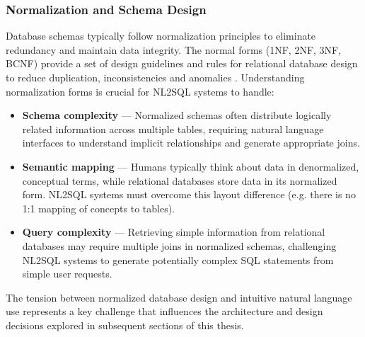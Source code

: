 \subsubsection{Normalization and Schema Design}

Database schemas typically follow normalization principles to eliminate redundancy and maintain data integrity. The normal forms
(1NF, 2NF, 3NF, BCNF) provide a set of design guidelines and rules for relational database design to reduce duplication,
inconsistencies and anomalies \citep{DatabaseSystemIntro}. Understanding normalization forms is crucial for NL2SQL systems to handle:

\begin{itemize}
    \item \textbf{Schema complexity} — Normalized schemas often distribute logically related information across multiple tables,
          requiring natural language interfaces to understand implicit relationships and generate appropriate joins.
    \item \textbf{Semantic mapping} — Humans typically think about data in denormalized, conceptual terms, while relational databases
          store data in its normalized form. NL2SQL systems must overcome this layout difference (e.g. there is no 1:1 mapping
          of concepts to tables).
    \item \textbf{Query complexity} — Retrieving simple information from relational databases may require multiple joins in normalized schemas,
          challenging NL2SQL systems to generate potentially complex SQL statements from simple user requests.
\end{itemize}

The tension between normalized database design and intuitive natural language use represents a key challenge that influences
the architecture and design decisions explored in subsequent sections of this thesis.
